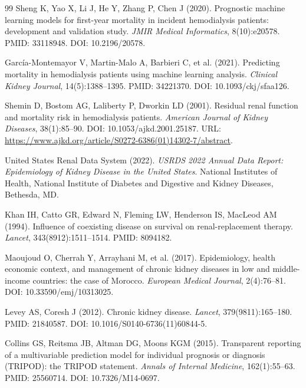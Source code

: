 \documentclass[12pt,a4paper,twoside]{report}
\begin{document}
\begin{thebibliography}{99}
Sheng K, Yao X, Li J, He Y, Zhang P, Chen J (2020).
\newblock Prognostic machine learning models for first-year mortality in incident hemodialysis patients: development and validation study.
\newblock \textit{JMIR Medical Informatics}, 8(10):e20578.
\newblock PMID: 33118948. DOI: 10.2196/20578.

Garc\'ia-Montemayor V, Martin-Malo A, Barbieri C, et al. (2021).
\newblock Predicting mortality in hemodialysis patients using machine learning analysis.
\newblock \textit{Clinical Kidney Journal}, 14(5):1388--1395.
\newblock PMID: 34221370. DOI: 10.1093/ckj/sfaa126.


Shemin D, Bostom AG, Laliberty P, Dworkin LD (2001).
\newblock Residual renal function and mortality risk in hemodialysis patients.
\newblock \textit{American Journal of Kidney Diseases}, 38(1):85--90.
\newblock DOI: 10.1053/ajkd.2001.25187. URL: \url{https://www.ajkd.org/article/S0272-6386(01)14302-7/abstract}.

United States Renal Data System (2022).
\newblock \textit{USRDS 2022 Annual Data Report: Epidemiology of Kidney Disease in the United States}.
\newblock National Institutes of Health, National Institute of Diabetes and Digestive and Kidney Diseases, Bethesda, MD.

Khan IH, Catto GR, Edward N, Fleming LW, Henderson IS, MacLeod AM (1994).
\newblock Influence of coexisting disease on survival on renal-replacement therapy.
\newblock \textit{Lancet}, 343(8912):1511--1514.
\newblock PMID: 8094182.

Maoujoud O, Cherrah Y, Arrayhani M, et al. (2017).
\newblock Epidemiology, health economic context, and management of chronic kidney diseases in low and middle-income countries: the case of Morocco.
\newblock \textit{European Medical Journal}, 2(4):76--81.
\newblock DOI: 10.33590/emj/10313025.

Levey AS, Coresh J (2012).
\newblock Chronic kidney disease.
\newblock \textit{Lancet}, 379(9811):165--180.
\newblock PMID: 21840587. DOI: 10.1016/S0140-6736(11)60844-5.

Collins GS, Reitsma JB, Altman DG, Moons KGM (2015).
\newblock Transparent reporting of a multivariable prediction model for individual prognosis or diagnosis (TRIPOD): the TRIPOD statement.
\newblock \textit{Annals of Internal Medicine}, 162(1):55--63.
\newblock PMID: 25560714. DOI: 10.7326/M14-0697.


\end{thebibliography}
\end{document}
